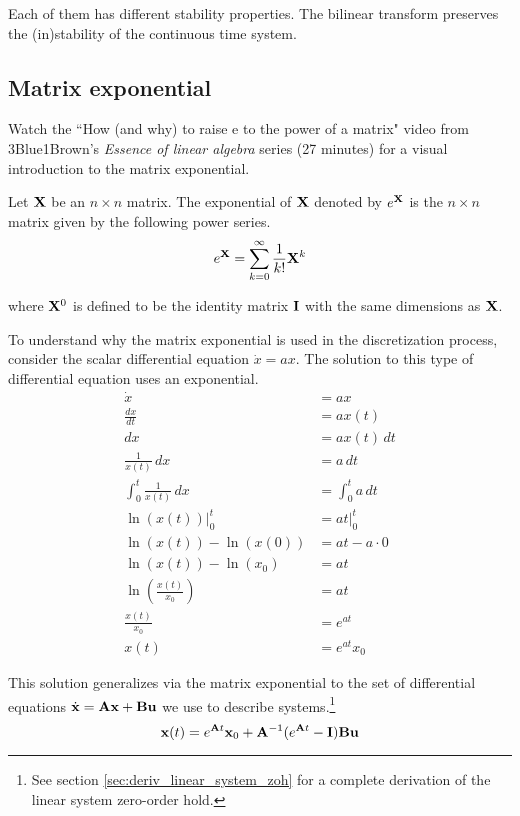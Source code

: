 Each of them has different stability properties. The bilinear transform
preserves the (in)stability of the continuous time \gls{system}.

\subsection{Matrix exponential}
\begin{remark}
  Watch the ``How (and why) to raise e to the power of a matrix" video from
  3Blue1Brown's \textit{Essence of linear algebra} series (27 minutes)
  \cite{bib:3b1b_linalg_matrix_exp} for a visual introduction to the matrix
  exponential.
\end{remark}
\begin{definition}
  Let $\mathbf{X}$ be an $n \times n$ matrix. The exponential of $\mathbf{X}$ denoted
  by $e^{\mathbf{X}}$ is the $n \times n$ matrix given by the following power
  series.
  \begin{equation}
    e^{\mathbf{X}} = \sum_{k=0}^\infty \frac{1}{k!} \mathbf{X}^k \label{eq:mat_exp}
  \end{equation}

  where $\mathbf{X}^0$ is defined to be the identity matrix $\mathbf{I}$ with the same
  dimensions as $\mathbf{X}$.
\end{definition}

To understand why the matrix exponential is used in the \gls{discretization}
process, consider the scalar differential equation $\dot{x} = ax$. The solution
to this type of differential equation uses an exponential.
\begin{align*}
  \dot{x} &= ax \\
  \frac{dx}{dt} &= ax(t) \\
  dx &= ax(t) \,dt \\
  \frac{1}{x(t)} \,dx &= a \,dt \\
  \int_0^t \frac{1}{x(t)} \,dx &= \int_0^t a \,dt \\
  \ln(x(t)) \rvert_0^t &= at \rvert_0^t \\
  \ln(x(t)) - \ln(x(0)) &= at - a \cdot 0 \\
  \ln(x(t)) - \ln(x_0) &= at \\
  \ln\left(\frac{x(t)}{x_0}\right) &= at \\
  \frac{x(t)}{x_0} &= e^{at} \\
  x(t) &= e^{at} x_0
\end{align*}

This solution generalizes via the matrix exponential to the set of differential
equations $\dot{\mathbf{x}} = \mathbf{A}\mathbf{x} + \mathbf{B}\mathbf{u}$ we use to describe
\glspl{system}.\footnote{See section \ref{sec:deriv_linear_system_zoh} for a
complete derivation of the linear system zero-order hold.}
\begin{equation*}
  \mathbf{x}(t) = e^{\mathbf{A}t} \mathbf{x}_0 +
    \mathbf{A}^{-1}(e^{\mathbf{A}t} - \mathbf{I})\mathbf{B} \mathbf{u}
\end{equation*}

